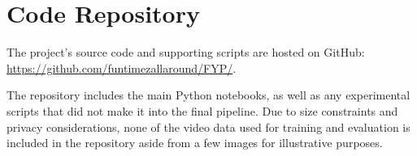 \chapter{Code Repository}\label{chp:code_repository}
\noindent The project's source code and supporting scripts are hosted on GitHub: \url{https://github.com/funtimezallaround/FYP/}.

\noindent The repository includes the main Python notebooks, as well as any experimental scripts that did not make it into the final pipeline. Due to size constraints and privacy considerations, none of the video data used for training and evaluation is included in the repository aside from a few images for illustrative purposes.
